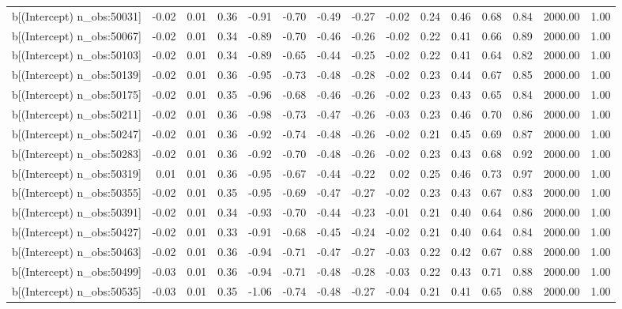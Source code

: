 \begin{table}[ht]
\begin{tabular}{rrrrrrrrrrrrrrr}
  b[(Intercept) n\_obs:50031] & -0.02 & 0.01 & 0.36 & -0.91 & -0.70 & -0.49 & -0.27 & -0.02 & 0.24 & 0.46 & 0.68 & 0.84 & 2000.00 & 1.00 \\ 
  b[(Intercept) n\_obs:50067] & -0.02 & 0.01 & 0.34 & -0.89 & -0.70 & -0.46 & -0.26 & -0.02 & 0.22 & 0.41 & 0.66 & 0.89 & 2000.00 & 1.00 \\ 
  b[(Intercept) n\_obs:50103] & -0.02 & 0.01 & 0.34 & -0.89 & -0.65 & -0.44 & -0.25 & -0.02 & 0.22 & 0.41 & 0.64 & 0.82 & 2000.00 & 1.00 \\ 
  b[(Intercept) n\_obs:50139] & -0.02 & 0.01 & 0.36 & -0.95 & -0.73 & -0.48 & -0.28 & -0.02 & 0.23 & 0.44 & 0.67 & 0.85 & 2000.00 & 1.00 \\ 
  b[(Intercept) n\_obs:50175] & -0.02 & 0.01 & 0.35 & -0.96 & -0.68 & -0.46 & -0.26 & -0.02 & 0.23 & 0.43 & 0.65 & 0.84 & 2000.00 & 1.00 \\ 
  b[(Intercept) n\_obs:50211] & -0.02 & 0.01 & 0.36 & -0.98 & -0.73 & -0.47 & -0.26 & -0.03 & 0.23 & 0.46 & 0.70 & 0.86 & 2000.00 & 1.00 \\ 
  b[(Intercept) n\_obs:50247] & -0.02 & 0.01 & 0.36 & -0.92 & -0.74 & -0.48 & -0.26 & -0.02 & 0.21 & 0.45 & 0.69 & 0.87 & 2000.00 & 1.00 \\ 
  b[(Intercept) n\_obs:50283] & -0.02 & 0.01 & 0.36 & -0.92 & -0.70 & -0.48 & -0.26 & -0.02 & 0.23 & 0.43 & 0.68 & 0.92 & 2000.00 & 1.00 \\ 
  b[(Intercept) n\_obs:50319] & 0.01 & 0.01 & 0.36 & -0.95 & -0.67 & -0.44 & -0.22 & 0.02 & 0.25 & 0.46 & 0.73 & 0.97 & 2000.00 & 1.00 \\ 
  b[(Intercept) n\_obs:50355] & -0.02 & 0.01 & 0.35 & -0.95 & -0.69 & -0.47 & -0.27 & -0.02 & 0.23 & 0.43 & 0.67 & 0.83 & 2000.00 & 1.00 \\ 
  b[(Intercept) n\_obs:50391] & -0.02 & 0.01 & 0.34 & -0.93 & -0.70 & -0.44 & -0.23 & -0.01 & 0.21 & 0.40 & 0.64 & 0.86 & 2000.00 & 1.00 \\ 
  b[(Intercept) n\_obs:50427] & -0.02 & 0.01 & 0.33 & -0.91 & -0.68 & -0.45 & -0.24 & -0.02 & 0.21 & 0.40 & 0.64 & 0.84 & 2000.00 & 1.00 \\ 
  b[(Intercept) n\_obs:50463] & -0.02 & 0.01 & 0.36 & -0.94 & -0.71 & -0.47 & -0.27 & -0.03 & 0.22 & 0.42 & 0.67 & 0.88 & 2000.00 & 1.00 \\ 
  b[(Intercept) n\_obs:50499] & -0.03 & 0.01 & 0.36 & -0.94 & -0.71 & -0.48 & -0.28 & -0.03 & 0.22 & 0.43 & 0.71 & 0.88 & 2000.00 & 1.00 \\ 
  b[(Intercept) n\_obs:50535] & -0.03 & 0.01 & 0.35 & -1.06 & -0.74 & -0.48 & -0.27 & -0.04 & 0.21 & 0.41 & 0.65 & 0.88 & 2000.00 & 1.00 \\ 

\end{tabular}
\end{table}
